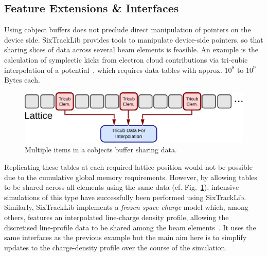 \documentclass[a4paper,
               refpage,       %
               keeplastbox,   %
               ]{jacow}
\begin{document}
\subsection{Feature Extensions \& Interfaces}
Using cobject buffers does not preclude direct manipulation of pointers on the device side. SixTrackLib provides tools to manipulate device-side pointers, so that sharing slices of data across several beam elements is feasible. An example is the calculation of symplectic kicks from electron cloud contributions via tri-cubic interpolation of a potential~\cite{kparaschou-2020}, which requires data-tables with approx. $10^8$ to $10^9$ Bytes each. 
\begin{figure}[!hbt]
    \centering
    \includegraphics*[width=.9\columnwidth]{THPAB190_f3}
    \caption{Multiple items in a cobjects buffer sharing data.}
    \label{fig:be_external_data}
\end{figure}
Replicating these tables at each required lattice position would not be possible due to the cumulative global memory requirements. However, by allowing tables to be shared across all elements using the same data (cf. Fig.~\ref{fig:be_external_data}), intensive simulations of this type have successfully been performed using SixTrackLib.
Similarly, SixTrackLib implements a \textit{frozen space charge} model which, among others, features an interpolated line-charge density profile, allowing the discretised line-profile data to be shared among the beam elements~\cite{aoeftiger-2021}. It uses the same interfaces as the previous example but the main aim here is to simplify updates to the charge-density profile over the course of the simulation.
\end{document}
